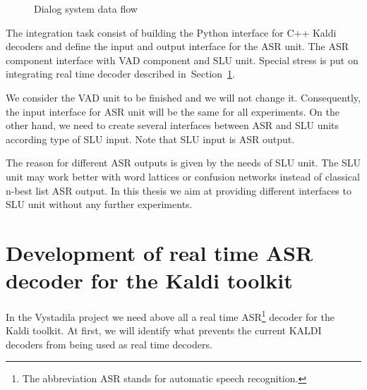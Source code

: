 \begin{figure}
    \begin{center}
    
    \caption{Dialog system data flow}
    \label{pic:dialog_system} 
    \end{center}
\end{figure}
The integration task consist of building the Python interface for C++ Kaldi decoders and define the input and output interface for the ASR unit. The ASR component interface with VAD component and SLU unit. Special stress is put on integrating real time decoder described in~Section~\ref{sec:kaldi_rt_decoder}.

We consider the VAD unit to be finished and we will not change it. Consequently, the input interface for ASR unit will be the same for all experiments. On the other hand, we need to create several interfaces between ASR and SLU units according type of SLU input. Note that SLU input is ASR output. 

The reason for different ASR outputs is given by the needs of SLU unit. The SLU unit may work better with word lattices or confusion networks instead of classical n-best list ASR output. In this thesis we aim at providing different interfaces to SLU unit without any further experiments.




\section{Development of real time ASR decoder for the Kaldi toolkit}
\label{sec:kaldi_rt_decoder}
In the Vystadila project we need above all a real time ASR\footnote{The abbreviation ASR stands for automatic speech recognition.} decoder for the Kaldi toolkit. At first, we will identify what prevents the current KALDI decoders from being used as real time decoders. 

